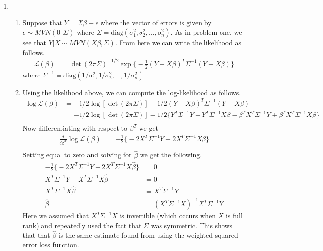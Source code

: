 \documentclass[12pt]{article}  %
\newcommand{\e}{{\epsilon}}
\begin{document}
\begin{enumerate}
\item 
\begin{enumerate}

\item Suppose that $Y = X\beta + \e$ where the vector of errors is given by $\e\sim MVN(0, \Sigma)$ where $\Sigma = \text{diag}(\sigma^2_1, \sigma^2_2, \ldots, \sigma^2_n)$. As in problem one, we see that $Y|X\sim MVN(X\beta, \Sigma)$. From here we can write the likelihood as follows. 
\begin{align*}
\mathcal{L}(\beta) &= \det(2\pi\Sigma)^{-1/2}\exp\Big\{-\frac{1}{2}(Y - X\beta)^{T}\Sigma^{-1}(Y-X\beta)\Big\}
\end{align*}
where $\Sigma^{-1} = \text{diag}(1/\sigma_1^2,1/\sigma_2^2,\ldots,1/\sigma_n^2)$. 


\item Using the likelihood above, we can compute the log-likelihood as follows. 
\begin{align*}
\log\mathcal{L}(\beta) &= -1/2\log[\det(2\pi\Sigma)]-1/2(Y - X\beta)^{T}\Sigma^{-1}(Y-X\beta)\\
 &= -1/2\log[\det(2\pi\Sigma)]-1/2\Big\{Y^T\Sigma^{-1}Y - Y^T\Sigma^{-1}X\beta - \beta^TX^T\Sigma^{-1}Y + \beta^TX^T\Sigma^{-1}X\beta\Big\}\\
\end{align*}
Now differentiating with respect to $\beta^T$ we get 
\begin{align*}
\frac{d}{d\beta^T}\log\mathcal{L}(\beta) &= -\frac{1}{2}\Big\{-2X^T\Sigma^{-1}Y + 2X^T\Sigma^{-1}X\beta\Big\}\\
\end{align*}
Setting equal to zero and solving for $\hat{\beta}$ we get the following. 
\begin{align*}
-\frac{1}{2}\Big\{-2X^T\Sigma^{-1}Y + 2X^T\Sigma^{-1}X\hat{\beta}\Big\}&= 0\\
X^T\Sigma^{-1}Y -X^T\Sigma^{-1}X\hat{\beta}&= 0\\
X^T\Sigma^{-1}X\hat{\beta}&= X^T\Sigma^{-1}Y\\
\hat{\beta} &= (X^T\Sigma^{-1}X)^{-1}X^T\Sigma^{-1}Y
\end{align*}
Here we assumed that $X^T\Sigma^{-1}X$ is invertible (which occurs when $X$ is full rank) and repeatedly used the fact that $\Sigma$ was symmetric. This shows that that $\hat{\beta}$ is the same estimate found from using the weighted squared error loss function. 


\end{enumerate}	

\end{enumerate}	
\end{document}
